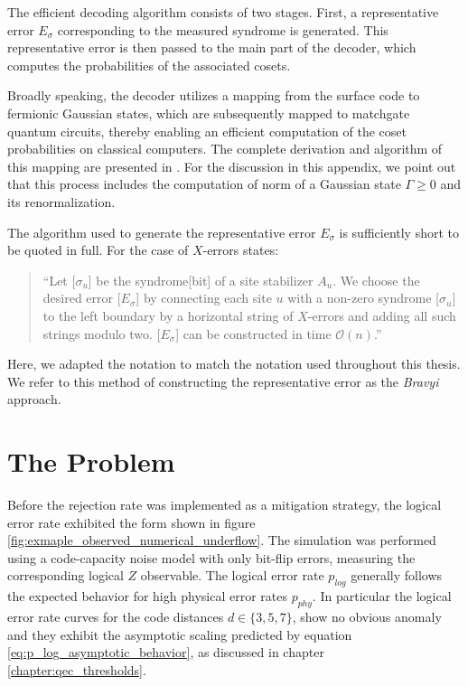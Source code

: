 The efficient decoding algorithm consists of two stages. 
First, a representative error $E_\sigma$ corresponding to the measured syndrome is generated.
This representative error is then passed to the main part of the decoder, 
which computes the probabilities of the associated cosets.

Broadly speaking, the decoder utilizes a mapping from the surface code to fermionic Gaussian states, 
which are subsequently mapped to matchgate quantum circuits, thereby enabling an efficient computation of the coset probabilities on classical computers.
The complete derivation and algorithm of this mapping are presented in \cite{efficient_decoding_algorithm}.
For the discussion in this appendix, we point out that this process includes the computation of norm of a Gaussian state $\Gamma \geq 0$ and its renormalization.

The algorithm used to generate the representative error $E_\sigma$ is sufficiently short to be quoted in full. 
For the case of $X$-errors \cite{efficient_decoding_algorithm} states:
\begin{quotation}
``Let [$\sigma_u$] be the syndrome[bit] of a site stabilizer $A_u$. 
We choose the desired error [$E_\sigma$] by connecting each site $u$ with a non-zero syndrome [$\sigma_u$] to the left boundary by a horizontal string of $X$-errors 
and adding all such strings modulo two. 
[$E_\sigma$] can be constructed in time $\mathcal{O}(n)$.'' 
\end{quotation}
Here, we adapted the notation to match the notation used throughout this thesis. 
We refer to this method of constructing the representative error as the \emph{Bravyi} approach.


\section{The Problem}\label{sec:num_underflow_the_problem}

Before the rejection rate was implemented as a mitigation strategy, the logical error rate exhibited the form shown in figure \ref{fig:exmaple_observed_numerical_underflow}.
The simulation was performed using a code-capacity noise model with only bit-flip errors, measuring the corresponding logical $Z$ observable.
The logical error rate $p_{log}$ generally follows the expected behavior for high physical error rates $p_{phy}$.
In particular the logical error rate curves for the code distances $d\in \{3,5,7\}$, show no obvious anomaly and they exhibit the asymptotic scaling predicted by equation \eqref{eq:p_log_asymptotic_behavior}, as discussed in chapter \ref{chapter:qec_thresholds}.


